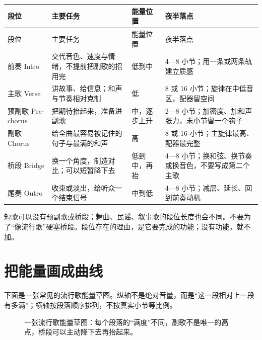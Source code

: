 \begin{longtable}{p{}p{}p{}p{}}
\toprule
段位 & 主要任务 & 能量位置 & 夜半落点 \\
\midrule
\endfirsthead
\toprule
段位 & 主要任务 & 能量位置 & 夜半落点 \\
\midrule
\endhead
前奏 Intro & 交代音色、速度与情绪，不提前把副歌的招用完 & 低到中 & 4—8 小节；用一条或两条轨建立质感 \\
主歌 Verse & 讲故事、给信息；和声与节奏相对克制 & 低 & 8 或 16 小节；旋律在中低音区，配器留空间 \\
预副歌 Pre-chorus & 把期待抬起来，准备进副歌 & 中，逐步上升 & 2—8 小节；加密度、加和声张力，末小节留一个钩子 \\
副歌 Chorus & 给全曲最容易被记住的句子与最满的和声 & 高 & 8 或 16 小节；主旋律最高、配器最完整 \\
桥段 Bridge & 换一个角度，制造对比；可以短暂降下去 & 低到中，再抬 & 4—8 小节；换和弦、换节奏或换音色，不要写成第二个主歌 \\
尾奏 Outro & 收束或淡出，给听众一个结束信号 & 中到低 & 4—8 小节；减层、延长、回到前奏动机 \\
\bottomrule
\end{longtable}

短歌可以没有预副歌或桥段；舞曲、民谣、叙事歌的段位长度也会不同。不要为了“像流行歌”硬塞桥段。段位存在的理由，是它要完成的功能；没有功能，就不加。

\section{把能量画成曲线}
\label{sec:energy-curve}

下面是一张常见的流行歌能量草图。纵轴不是绝对音量，而是“这一段相对上一段有多满”；横轴按段落顺序排列，不按真实小节等比例。

\begin{figure}[htbp]
  \centering
  \caption{一张流行歌能量草图：每个段落的“满度”不同，副歌不是唯一的高点，桥段可以主动降下去再抬起来。}
  \label{fig:energy-curve}
\end{figure}

